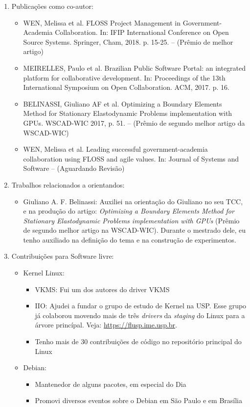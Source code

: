 \begin{enumerate}
  \item Publicações como co-autor:
    \begin{itemize}
			\item
WEN, Melissa et al. FLOSS Project Management in Government-Academia Collaboration. In: IFIP International Conference on Open Source Systems. Springer, Cham, 2018. p. 15-25. -- (Prêmio de melhor artigo)
      \item 
MEIRELLES, Paulo et al. Brazilian Public Software Portal: an integrated platform for collaborative development. In: Proceedings of the 13th International Symposium on Open Collaboration. ACM, 2017. p. 16.
      \item
BELINASSI, Giuliano AF et al. Optimizing a Boundary Elements Method for Stationary Elastodynamic Problems implementation with GPUs. WSCAD-WIC 2017, p. 51. -- (Prêmio de segundo melhor artigo da WSCAD-WIC)
      \item
WEN, Melissa et al. Leading successful government-academia collaboration using FLOSS and agile values. In: Journal of Systems and Software -- (Aguardando Revisão)
    \end{itemize}
  \item Trabalhos relacionados a orientandos:
    \begin{itemize}
      \item
Giuliano A. F. Belinassi: Auxiliei na orientação do Giuliano no seu TCC, e na
produção do artigo: \emph{Optimizing a Boundary Elements Method for Stationary
Elastodynamic Problems implementation with GPUs} (Prêmio de segundo melhor
artigo na WSCAD-WIC). Durante o mestrado dele, eu tenho auxiliado na definição
do tema e na construção de experimentos.
    \end{itemize}
  \item Contribuições para Software livre:
    \begin{itemize}
      \item Kernel Linux:
        \begin{itemize}
          \item VKMS: Fui um dos autores do driver VKMS
          \item IIO: Ajudei a fundar o grupo de estudo de Kernel na USP. Esse grupo já colaborou movendo mais de três \emph{drivers} da \emph{staging} do Linux para a árvore princípal. Veja: \url{https://flusp.ime.usp.br}.
          \item Tenho mais de 30 contribuições de código no repositório principal do Linux
        \end{itemize}
      \item Debian:
        \begin{itemize}
          \item Mantenedor de alguns pacotes, em especial do Dia
          \item Promovi diversos eventos sobre o Debian em São Paulo e em Brasília
        \end{itemize}
    \end{itemize}


\end{enumerate}
